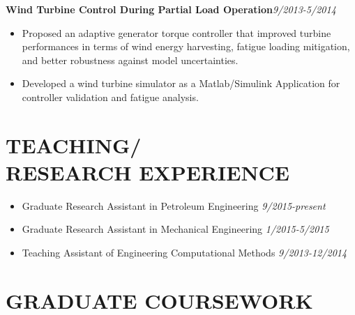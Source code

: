 \documentclass[margin, 9pt]{res} %
\begin{document}
\begin{resume}
\medskip
{\textbf{Wind Turbine Control During Partial Load Operation}}\hfill\textit{9/2013-5/2014}\\
\vspace*{-10pt}
\begin{itemize}[leftmargin=*] \itemsep -3pt
\vspace*{-5pt}
	\item Proposed an adaptive generator torque controller that  improved turbine performances in terms of wind energy harvesting, fatigue loading mitigation, and better robustness against model uncertainties.
    \item Developed a wind turbine simulator as a Matlab/Simulink Application  for controller validation and fatigue analysis.
\end{itemize}


\section{TEACHING/\\RESEARCH EXPERIENCE}
\begin{itemize}[leftmargin=*] \itemsep -2pt
\vspace*{-2pt}
	\item Graduate Research Assistant in Petroleum Engineering \hfill\textit{9/2015-present}
	\item Graduate Research Assistant in Mechanical Engineering \hfill\textit{1/2015-5/2015}
	\item Teaching Assistant of Engineering Computational Methods \hfill\textit{9/2013-12/2014}
\end{itemize}

\section{GRADUATE COURSEWORK}


\end{resume}
\end{document}
